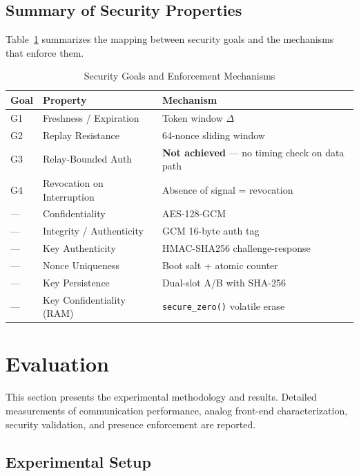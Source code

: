 \documentclass[conference]{IEEEtran}
\begin{document}
\subsection{Summary of Security Properties}

Table~\ref{tab:security_summary} summarizes the mapping between security goals and the mechanisms that enforce them.

\begin{table}[htbp]
\caption{Security Goals and Enforcement Mechanisms}
\begin{center}
\small
\begin{tabular}{|l|p{2.8cm}|p{3.0cm}|}
\hline
\textbf{Goal} & \textbf{Property} & \textbf{Mechanism} \\
\hline
G1 & Freshness / Expiration & Token window $\Delta$ \\
\hline
G2 & Replay Resistance & 64-nonce sliding window \\
\hline
G3 & Relay-Bounded Auth & \textbf{Not achieved} — no timing check on data path \\
\hline
G4 & Revocation on Interruption & Absence of signal = revocation \\
\hline
--- & Confidentiality & AES-128-GCM \\
\hline
--- & Integrity / Authenticity & GCM 16-byte auth tag \\
\hline
--- & Key Authenticity & HMAC-SHA256 challenge-response \\
\hline
--- & Nonce Uniqueness & Boot salt + atomic counter \\
\hline
--- & Key Persistence & Dual-slot A/B with SHA-256 \\
\hline
--- & Key Confidentiality (RAM) & \texttt{secure\_zero()} volatile erase \\
\hline
\end{tabular}
\label{tab:security_summary}
\end{center}
\end{table}

\section{Evaluation}

This section presents the experimental methodology and results. Detailed measurements of communication performance, analog front-end characterization, security validation, and presence enforcement are reported.

\subsection{Experimental Setup}
\label{sec:experimental-setup}
\end{document}
